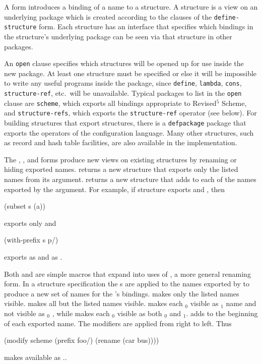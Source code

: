 \label{module-language-figure}

A  form introduces a binding of a name to a
structure.  A structure is a view on an underlying package which is
created according to the clauses of the {\tt define-structure} form.
Each structure has an interface that specifies which bindings in the
structure's underlying package can be seen via that structure in other
packages.

An {\tt open} clause specifies which structures will be opened up for
use inside the new package.  At least one structure must be specified or
else it will be impossible to write any useful programs inside the
package, since {\tt define}, {\tt lambda}, {\tt cons}, {\tt
structure-ref}, etc.\ will be unavailable.  Typical packages to list
in the {\tt open} clause are {\tt scheme}, which exports all bindings
appropriate to Revised$^5$ Scheme, and {\tt structure-refs}, which
exports the {\tt structure-ref} operator (see below).  For building
structures that export structures, there is a {\tt defpackage} package
that exports the operators of the configuration language.  Many other
structures, such as record and hash table facilities, are also
available in the \hack{} implementation.

The , , and
  forms produce new
 views on existing structures by renaming or hiding exported names.
 returns a new structure that exports only the listed names
 from its  argument.
 returns a new structure that adds 
 to each of the names exported by the  argument.
For example, if structure  exports  and ,
 then
\begin{example}
(subset s (a))
\end{example}
 exports only  and
\begin{example}
(with-prefix s p/)
\end{example}
exports  as  and  as .

Both  and  are simple macros that
 expand into uses of , a more general renaming form.
In a  structure specification the s are applied to
 the names exported
 by  to produce a new set of names for the 's
 bindings.
 makes only the listed names visible.
 makes all but the listed names visible.
 makes each $_0$ visible as $_1$ 
 name and not visible as $_0$ , while
  makes each $_0$ visible as both $_0$ 
 and $_1$.
 adds  to the beginning of each exported name.
The modifiers are applied from right to left.  Thus
\begin{example}
(modify scheme (prefix foo/) (rename (car bus))))
\end{example}
 makes  available as ..

